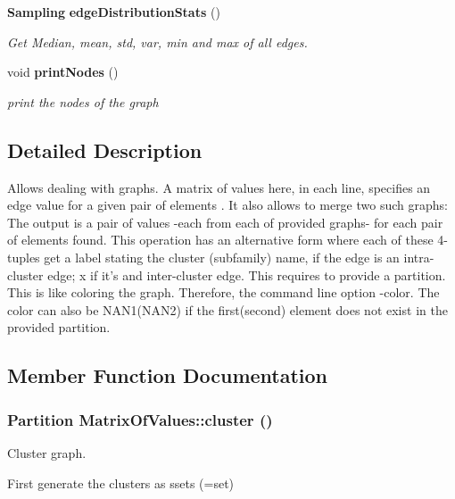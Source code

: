 \begin{CompactItemize}
\item 
{\bf Sampling} {\bf edge\-Distribution\-Stats} ()
\begin{CompactList}\small\item\em Get Median, mean, std, var, min and max of all edges. \item\end{CompactList}\item 
void {\bf print\-Nodes} ()\label{classMatrixOfValues_a30}

\begin{CompactList}\small\item\em print the nodes of the graph \item\end{CompactList}\end{CompactItemize}


\subsection{Detailed Description}
Allows dealing with graphs. A matrix of values here, in each line, specifies an edge value for a given pair of elements . It also allows to merge two such graphs: The output is a pair of values -each from each of provided graphs- for each pair of elements found. This operation has an alternative form where each of these 4-tuples get a label stating the cluster (subfamily) name, if the edge is an intra-cluster edge; x if it's and inter-cluster edge. This requires to provide a partition. This is like coloring the graph. Therefore, the command line option -color. The color can also be NAN1(NAN2) if the first(second) element does not exist in the provided partition. 



\subsection{Member Function Documentation}
\subsubsection{\setlength{\rightskip}{0pt plus 5cm}Partition Matrix\-Of\-Values::cluster ()}\label{classMatrixOfValues_a9}


Cluster graph. 

First generate the clusters as ssets (=set)

